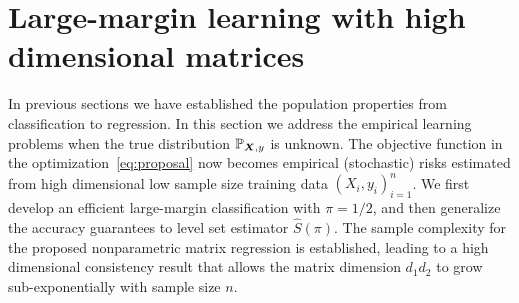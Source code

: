 \documentclass[12pt]{article}
\begin{document}
\section{Large-margin learning with high dimensional matrices}\label{sec:theory}

In previous sections we have established the population properties from classification to regression. In this section we address the empirical learning problems when the true distribution $\mathbb{P}_{\bm X,y}$ is unknown. The objective function in the optimization~\eqref{eq:proposal} now becomes empirical (stochastic) risks estimated from high dimensional low sample size training data $(X_i,y_i)_{i=1}^n$. We first develop an efficient large-margin classification with $\pi=1/2$, and then generalize the accuracy guarantees to level set estimator $\hat S(\pi)$. The sample complexity for the proposed nonparametric matrix regression is established, leading to a high dimensional consistency result that allows the matrix dimension $d_1d_2$ to grow sub-exponentially with sample size $n$.  
\end{document}
